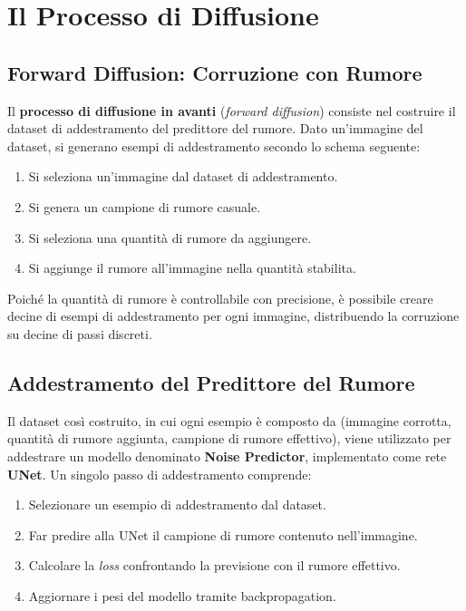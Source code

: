 \section{Il Processo di Diffusione}
\label{sec:diffusion-process}

\subsection{Forward Diffusion: Corruzione con Rumore}
\label{subsec:forward-diffusion}

Il \textbf{processo di diffusione in avanti} (\emph{forward diffusion})
consiste nel costruire il dataset di addestramento del predittore del
rumore. Dato un'immagine del dataset, si generano esempi di
addestramento secondo lo schema seguente:

\begin{enumerate}
  \item Si seleziona un'immagine dal dataset di addestramento.
  \item Si genera un campione di rumore casuale.
  \item Si seleziona una quantità di rumore da aggiungere.
  \item Si aggiunge il rumore all'immagine nella quantità stabilita.
\end{enumerate}

Poiché la quantità di rumore è controllabile con precisione, è possibile
creare decine di esempi di addestramento per ogni immagine, distribuendo
la corruzione su decine di passi discreti.

\subsection{Addestramento del Predittore del Rumore}
\label{subsec:noise-predictor-training}

Il dataset così costruito, in cui ogni esempio è composto da
(immagine corrotta, quantità di rumore aggiunta, campione di rumore
effettivo), viene utilizzato per addestrare un modello denominato
\textbf{Noise Predictor}, implementato come rete \textbf{UNet}.
Un singolo passo di addestramento comprende:

\begin{enumerate}
  \item Selezionare un esempio di addestramento dal dataset.
  \item Far predire alla UNet il campione di rumore contenuto
        nell'immagine.
  \item Calcolare la \emph{loss} confrontando la previsione con il
        rumore effettivo.
  \item Aggiornare i pesi del modello tramite backpropagation.
\end{enumerate}

